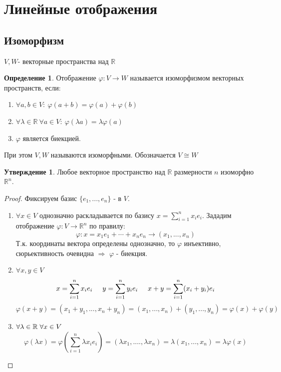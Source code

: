 \documentclass[a4paper, 12pt]{article}
\newcommand{\R}{\mathbb R}
\renewcommand{\phi}{\varphi}
\newcommand\tab[1][.5cm]{\hspace*{#1}}
\theoremstyle{definition}
\newtheorem*{definition}{Определение}
\newtheorem*{subtheorem}{Утверждение}
\begin{document}
  \section{Линейные отображения}
  \subsection{Изоморфизм}
  
  $V, W$- векторные пространства над $\R$ 
  \begin{definition}
    Отображение $\phi: V \to W$ называется изоморфизмом векторных пространств, если:
    \begin{enumerate}
      \item $\forall a, b \in V: \ \phi(a+b) = \phi(a) + \phi(b)$
      \item $\forall \lambda \in \R \ \forall a \in V: \ \phi(\lambda a) = \lambda \phi(a)$
      \item $\phi$ является биекцией. 
    \end{enumerate}
    При этом $V, W$ называются изоморфными. Обозначается $V \cong W$ 
  \end{definition} 
  \begin{subtheorem}
    Любое векторное  пространство над $\R$ размерности $n$ изоморфно $\R^n$. 
  \end{subtheorem} 
  \begin{proof}
    Фиксируем базис $\{e_1,...,e_n\}$ - в $V$.
    \begin{enumerate}
      \item $\forall x \in V$ однозначно раскладывается по базису $x = \sum \limits_{i=1}^{n} x_ie_i$. 
    Зададим отображение  $\phi: V \to \R^n$ по правилу:
    $$\phi: x = x_1e_1 + \cdots + x_ne_n \to (x_1,...,x_n)$$
    Т.к. координаты вектора определены однозначно, то $\phi$ инъективно, сюрьективность очевидна $\Longrightarrow $ $\phi$ - биекция.
    \item $\forall x,y \in V$
    $$x = \sum \limits_{i=1}^{n} x_ie_i \tab[0.5cm] y = \sum \limits_{i=1}^{n} y_ie_i \tab[0.5cm]
    x + y = \sum \limits_{i=1}^{n} (x_i + y_i)e_i$$ 
    $$\phi(x+y) = (x_1 + y_1,...,x_n+y_n) = (x_1,...,x_n) + (y_1,...,y_n) = \phi(x) + \phi(y)$$ 
    \item $\forall \lambda \in \R \tab[0.1cm] \forall x \in V$
    $$\phi(\lambda x) = \phi(\sum \limits_{i=1}^{n} \lambda x_ie_i) = (\lambda x_1,....,\lambda x_n) = \lambda (x_1,...,x_n) = \lambda \phi(x)$$  
    \end{enumerate}
  \end{proof} 
\end{document}
